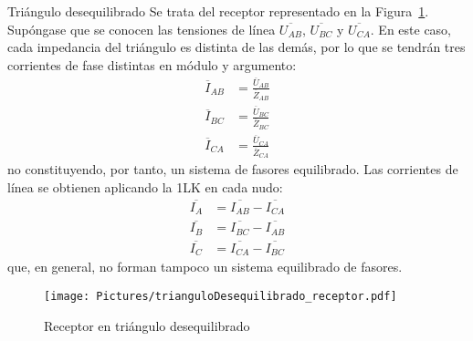 \documentclass[11pt]{book} %
\makeatletter
\numberwithin{dummy}{section}
\theoremstyle{ocrenumbox}
\theoremstyle{blacknumex}
\theoremstyle{blacknumbox}
\theoremstyle{ocrenum}
\renewcommand{\subsubsection}{\@startsection {subsubsection}{3}{\z@}
{-2ex \@plus -0.1ex \@minus -.2ex}
{.2ex \@plus.2ex }
{\normalfont\small\sffamily\bfseries}}
\makeatother
\begin{document}
	\subsubsection{Triángulo desequilibrado}
	Se trata del receptor representado en la Figura~\ref{fig.trianguloDesequilibrado_receptor}. Supóngase que se conocen las tensiones de línea $\overline{U_{AB}}$, $\overline{U_{BC}}$ y $\overline{U_{CA}}$. En este caso, cada impedancia del triángulo es distinta de las demás, por lo que se tendrán tres corrientes de fase distintas en módulo y argumento:
	\begin{align*}
      \overline{I}_{AB} &= \frac{\overline{U}_{AB}}{\overline{Z}_{AB}}\\
      \overline{I}_{BC} &= \frac{\overline{U}_{BC}}{\overline{Z}_{BC}}\\
      \overline{I}_{CA} &= \frac{\overline{U}_{CA}}{\overline{Z}_{CA}}
    \end{align*}
    no constituyendo, por tanto, un sistema de fasores equilibrado. Las corrientes de línea se obtienen aplicando la 1LK en cada nudo:
    \begin{align}
      \overline{I_A} &= \overline{I_{AB}} - \overline{I_{CA}} \\
      \overline{I_B} &= \overline{I_{BC}} - \overline{I_{AB}}\\
      \overline{I_C} &= \overline{I_{CA}} - \overline{I_{BC}}
    \end{align}
    que, en general, no forman tampoco un sistema equilibrado de fasores.
	
	\begin{figure}
	    \centering
	    \texttt{[image: Pictures/trianguloDesequilibrado\_receptor.pdf]}
	    \caption{Receptor en triángulo desequilibrado}
	    \label{fig.trianguloDesequilibrado_receptor}
	\end{figure}
	
\end{document}
